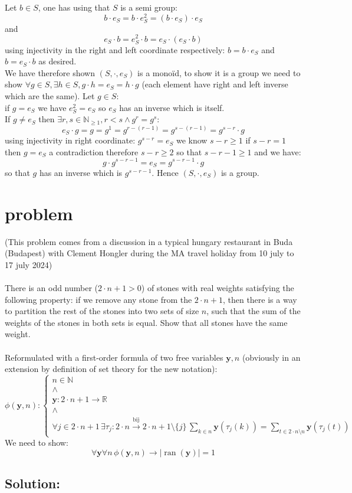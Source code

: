 \documentclass[11pt, a4paper, oneside]{article}
\newcommand{\problem}[1][]{\section{#1} \hfill \par}
\newcommand{\solution}[1][]{\subsection*{#1}\hfill \par}
\theoremstyle{remark}
\theoremstyle{lemma}
\begin{document}
Let $b\in S$, one has using that $S$ is a semi group: $$b\cdot e_S=b\cdot e_S^2=(b\cdot e_S)\cdot e_S$$
and $$e_S\cdot b=e_S^2\cdot b=e_S\cdot(e_S\cdot b)$$
using injectivity in the right and left coordinate respectively:
$b=b\cdot e_S$ and $b=e_S\cdot b$
as desired.\\
We have therefore shown $(S,\cdot,e_S)$ is a monoïd, to show it is a group we need to show $\forall g\in S,\exists h\in S,g\cdot h=e_S=h\cdot g$ (each element have right and left inverse which are the same).
Let $g\in S$:\\
if $g=e_S$ we have $e_S^2=e_S$ so $e_S$ has an inverse which is itself.
\\
If $g\neq e_S$ then $\exists r,s\in\mathbb{N}_{\geq 1}, r< s\wedge g^r=g^s$:
$$e_S\cdot g=g=g^1=g^{r-(r-1)}=g^{s-(r-1)}=g^{s-r}\cdot g$$
using injectivity in right coordinate:
$g^{s-r}=e_S$ we know $s-r\geq 1$ if $s-r=1$ then $g=e_S$ a contradiction therefore $s-r\geq 2$ so that $s-r-1\geq 1$ and we have:
$$g\cdot g^{s-r-1}=e_S=g^{s-r-1}\cdot g$$
so that $g$ has an inverse which is $g^{s-r-1}$.
Hence $(S,\cdot,e_S)$ is a group.

\newpage
\problem[problem]
(This problem comes from a discussion in a typical hungary restaurant in Buda (Budapest) with Clement Hongler during the MA travel holiday from 10 july to 17 july 2024)
\\\\
There is an odd number ($2 \cdot n + 1 > 0$) of stones with real weights satisfying the following property: if we remove any stone from the $2 \cdot n + 1$, then there is a way to partition the rest of the stones into two sets of size $n$, such that the sum of the weights of the stones in both sets is equal. Show that all stones have the same weight.
\\\\
Reformulated with a first-order formula of two free variables $\mathbf{y}, n$ (obviously in an extension by definition of set theory for the new notation):
$$
\phi(\mathbf{y}, n):\begin{cases}
n \in \mathbb{N} \\
\wedge \\
\mathbf{y}: 2 \cdot n + 1 \to \mathbb{R} \\
\wedge \\
\forall j \in 2 \cdot n + 1 \, \exists \tau_j: 2 \cdot n \overset{\text{bij}}{\rightarrow} 2 \cdot n + 1 \setminus \{j\} \, \sum_{k \in n} \mathbf{y}(\tau_j(k)) = \sum_{t \in 2 \cdot n \setminus n} \mathbf{y}(\tau_j(t))
\end{cases}
$$
We need to show:
$$
\forall \mathbf{y} \forall n \, \phi(\mathbf{y}, n) \rightarrow | \operatorname{ran}(\mathbf{y}) | = 1
$$
\solution[Solution:]
\end{document}
